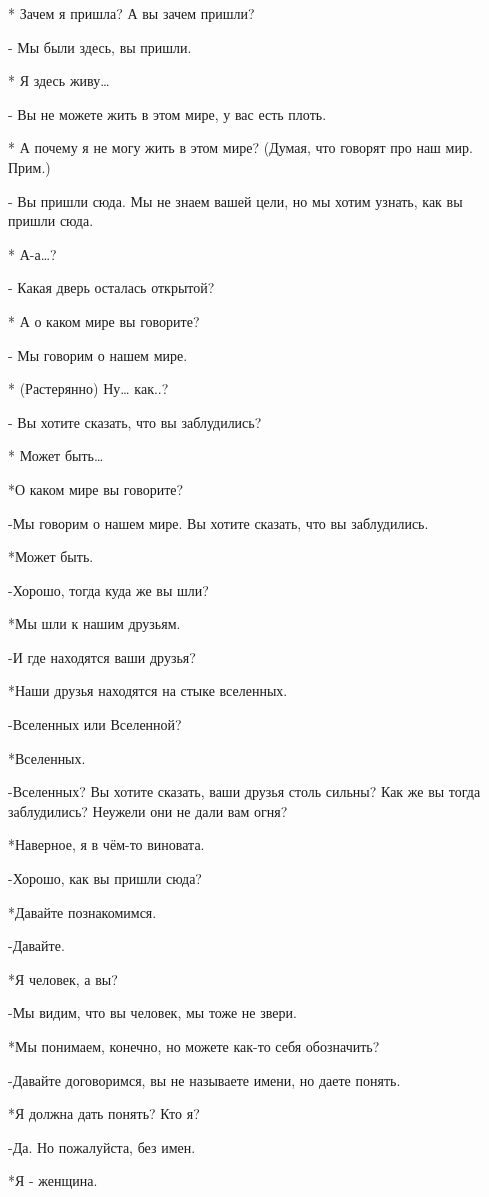 * Зачем я пришла? А вы зачем пришли?

- Мы были здесь, вы пришли.

* Я здесь живу…

- Вы не можете жить в этом мире, у вас есть плоть.

* А почему я не могу жить в этом мире? (Думая, что говорят про наш мир. Прим.)

- Вы пришли сюда. Мы не знаем вашей цели, но мы хотим узнать, как вы пришли сюда.

* А-а…?

- Какая дверь осталась открытой?

* А о каком мире вы говорите?

- Мы говорим о нашем мире. 

*  (Растерянно) Ну… как..?

- Вы хотите сказать, что вы заблудились?

* Может быть…

*О каком мире вы говорите?

-Мы говорим о нашем мире. Вы хотите сказать, что вы заблудились.

*Может быть.

-Хорошо, тогда куда же вы шли?

*Мы шли к нашим друзьям.

-И где находятся ваши друзья?

*Наши друзья находятся на стыке вселенных.

-Вселенных или Вселенной?

*Вселенных.

-Вселенных? Вы хотите сказать, ваши друзья столь сильны? Как же вы тогда заблудились? Неужели они не дали вам огня?

*Наверное, я в чём-то виновата.

-Хорошо, как вы пришли сюда?

*Давайте познакомимся.

-Давайте.

*Я человек, а вы?

-Мы видим, что вы человек, мы тоже не звери.

*Мы понимаем, конечно, но можете как-то себя обозначить?

-Давайте договоримся, вы не называете имени, но даете понять.

*Я должна дать понять? Кто я?

-Да. Но пожалуйста, без имен.

*Я - женщина.

